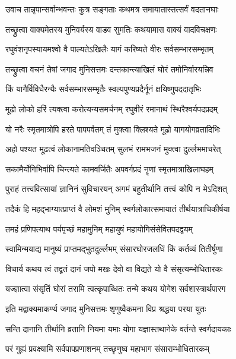\twolineshloka
{उवाच तान्नृपान्सर्वान्भवन्तः कुत्र सङ्गताः}
{कथमत्र समायातास्तत्सर्वं वदतानघाः}%

\twolineshloka
{तच्छ्रुत्वा वाक्यमेतस्य मुनिवर्यस्य वाडव}
{सुमतिः कथयामास वाक्यं वादविचक्षणः}%


\twolineshloka
{रघुवंशनृपस्यायमश्वो वै पाल्यतेऽखिलैः}
{यागं करिष्यते वीरः सर्वसम्भारसम्भृतम्}%

\twolineshloka
{तच्छ्रुत्वा वचनं तेषां जगाद मुनिसत्तमः}
{दन्तकान्त्याखिलं घोरं तमोनिर्वारयन्निव}%


\twolineshloka
{किं यागैर्विविधैरन्यैः सर्वसम्भारसम्भृतैः}
{स्वल्पपुण्यप्रदैर्नूनं क्षयिष्णुपददातृभिः}%

\twolineshloka
{मूढो लोको हरिं त्यक्त्वा करोत्यन्यसमर्चनम्}
{रघुवीरं रमानाथं स्थिरैश्वर्यपदप्रदम्}%

\twolineshloka
{यो नरैः स्मृतमात्रोपि हरते पापपर्वतम्}
{तं मुक्त्वा क्लिश्यते मूढो यागयोगव्रतादिभिः}%

\twolineshloka
{अहो पश्यत मूढत्वं लोकानामतिवञ्चितम्}
{सुलभं रामभजनं मुक्त्वा दुर्ल्लभमाचरेत्}%

\twolineshloka
{सकामैर्योगिभिर्वापि चिन्त्यते कामवर्जितैः}
{अपवर्गप्रदं नॄणां स्मृतमात्राखिलाघहम्}%

\twolineshloka
{पुराहं तत्त्ववित्सायां ज्ञानिनं सुविचारयन्}
{अगमं बहुतीर्थानि तत्त्वं कोपि न मेऽदिशत्}%

\twolineshloka
{तदैकं हि महद्भाग्यात्प्राप्तं वै लोमशं मुनिम्}
{स्वर्गलोकात्समायातं तीर्थयात्राचिकीर्षया}%

\twolineshloka
{तमहं प्रणिपत्याथ पर्यपृच्छं महामुनिम्}
{महायुषं महायोगिसंसेवितपदद्वयम्}%

\twolineshloka
{स्वामिन्मयाद्य मानुष्यं प्राप्तमद्भुतदुर्ल्लभम्}
{संसारघोरजलधिं किं कर्तव्यं तितीर्षुणा}%

\twolineshloka
{विचार्य कथय त्वं तद्व्रतं दानं जपो मखः}
{देवो वा विद्यते यो वै संसृत्यम्भोधितारकः}%

\twolineshloka
{यज्ज्ञात्वा संसृतिं घोरां तरामि त्वत्कृपाब्धितः}
{तन्मे कथय योगेश सर्वशास्त्रार्थपारग}%

\twolineshloka
{इति मद्वाक्यमाकर्ण्य जगाद मुनिसत्तमः}
{शृणुष्वैकमना विप्र श्रद्धया परया युतः}%

\twolineshloka
{सन्ति दानानि तीर्थानि व्रतानि नियमा यमाः}
{योगा यज्ञास्तथानेके वर्तन्ते स्वर्गदायकाः}%

\twolineshloka
{परं गुह्यं प्रवक्ष्यामि सर्वपापप्रणाशनम्}
{तच्छृणुष्व महाभाग संसाराम्भोधितारकम्}%


